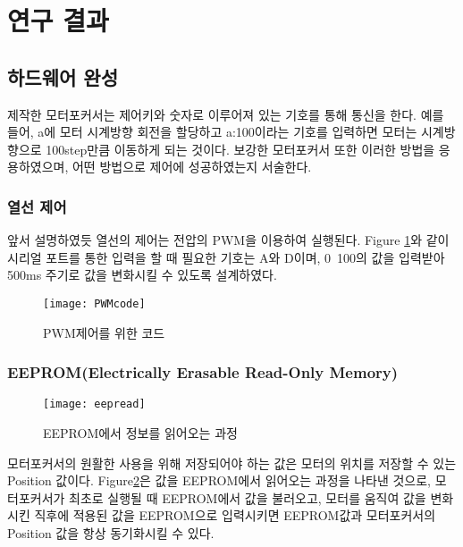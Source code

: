 \section{연구 결과}


\subsection{하드웨어 완성}
 제작한 모터포커서는 제어키와 숫자로 이루어져 있는 기호를 통해 통신을 한다. 예를 들어, a에 모터 시계방향 회전을 할당하고 a:100이라는 기호를 입력하면 모터는 시계방향으로 100step만큼 이동하게 되는 것이다. 보강한 모터포커서 또한 이러한 방법을 응용하였으며, 어떤 방법으로 제어에 성공하였는지 서술한다.
 
\subsubsection{열선 제어}

 앞서 설명하였듯 열선의 제어는 전압의 PWM을 이용하여 실행된다. \textrm{Figure} \ref{PWM}와 같이 시리얼 포트를 통한 입력을 할 때 필요한 기호는 A와 D이며, 0~100의 값을 입력받아 500ms 주기로 값을 변화시킬 수 있도록 설계하였다.
 
  \begin{figure}[ht]
 	\begin{center}
 		\texttt{[image: PWMcode]}
 	\end{center}
 	\caption{PWM제어를 위한 코드}
 	\label{PWM}
 \end{figure}
 
\subsubsection{EEPROM(Electrically Erasable Read-Only Memory)}

 \begin{figure}[ht]
	\begin{center}
		\texttt{[image: eepread]}
	\end{center}
	\caption{EEPROM에서 정보를 읽어오는 과정}
	\label{eepread}
\end{figure}

 모터포커서의 원활한 사용을 위해 저장되어야 하는 값은 모터의 위치를 저장할 수 있는 Position 값이다. \textrm{Figure}\ref{eepread}은 값을 EEPROM에서 읽어오는 과정을 나타낸 것으로, 모터포커서가 최초로 실행될 때 EEPROM에서 값을 불러오고, 모터를 움직여 값을 변화시킨 직후에 적용된 값을 EEPROM으로 입력시키면 EEPROM값과 모터포커서의 Position 값을 항상 동기화시킬 수 있다.
 
